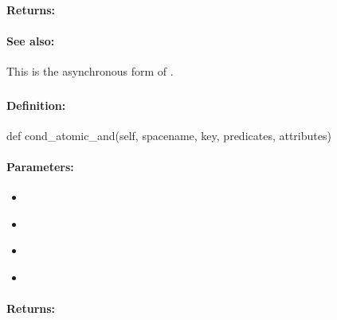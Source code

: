 \paragraph{Returns:}


\paragraph{See also:}  This is the asynchronous form of .

\pagebreak
\subsubsection{}
\label{api:python:cond_atomic_and}


\paragraph{Definition:}
\begin{pythoncode}
def cond_atomic_and(self, spacename, key, predicates, attributes)
\end{pythoncode}

\paragraph{Parameters:}
\begin{itemize}[noitemsep]
\item {}\\

\item {}\\

\item {}\\

\item {}\\

\end{itemize}

\paragraph{Returns:}


